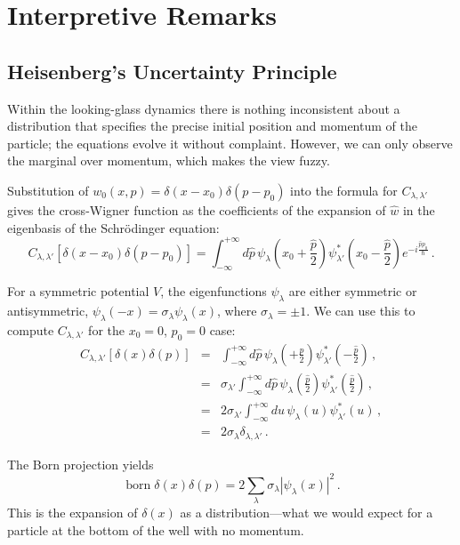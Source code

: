 \documentclass[12pt]{article}
\DeclareMathOperator\born{born}
\begin{document}
\section{Interpretive Remarks}
\subsection{Heisenberg's Uncertainty Principle}\label{sec:uncertainty}
Within the looking-glass dynamics there is nothing inconsistent about a distribution that specifies the precise initial position and momentum of the particle; the equations evolve it without complaint.  However, we can only observe the marginal over momentum, which makes the view fuzzy.

Substitution of $w_0(x,p)=\delta(x-x_0)\delta(p-p_0)$ into the formula for $C_{\lambda,\lambda'}$ gives the cross-Wigner function as the coefficients of the expansion of $\hat{w}$ in the eigenbasis of the Schr\"odinger equation:
\begin{equation}
C_{\lambda,\lambda'}[\delta(x-x_0)\delta(p-p_0)]  = \int_{-\infty}^{+\infty} d\hat{p} \, \psi_\lambda(x_0+\frac{\hat{p}}{2}) \psi_{\lambda'}^*(x_0-\frac{\hat{p}}{2}) e^{-i \frac{\hat{p} p_0}{\hbar}}\,.
\end{equation}

For a symmetric potential $V$, the eigenfunctions $\psi_\lambda$ are either symmetric or antisymmetric, $\psi_\lambda(-x)=\sigma_\lambda \psi_\lambda(x)$, where $\sigma_\lambda = \pm 1$. We can use this to compute $C_{\lambda,\lambda'}$ for the $x_0=0$, $p_0=0$ case:
\begin{eqnarray}
  C_{\lambda,\lambda'}[\delta(x)\delta(p)] &=& \int_{-\infty}^{+\infty} d\hat{p} \, \psi_\lambda(+\frac{\hat{p}}{2}) \psi_{\lambda'}^*(-\frac{\hat{p}}{2}) \,, \\
  &=& \sigma_{\lambda'} \int_{-\infty}^{+\infty} d\hat{p} \, \psi_\lambda(\frac{\hat{p}}{2}) \psi_{\lambda'}^*(\frac{\hat{p}}{2}) \,, \\
  &=& 2 \sigma_{\lambda'} \int_{-\infty}^{+\infty} d u \, \psi_\lambda(u) \psi_{\lambda'}^*(u) \,,\\
  &=& 2 \sigma_\lambda \delta_{\lambda,\lambda'} \,.
\end{eqnarray}

The Born projection yields
\begin{equation}
  \born \delta(x) \delta (p) = 2 \sum_{\lambda} \sigma_{\lambda} |\psi_{\lambda}(x)|^2 \,.
\end{equation}
This is the expansion of $\delta(x)$ as a distribution---what we would expect for a particle at the bottom of the well with no momentum.
\end{document}
